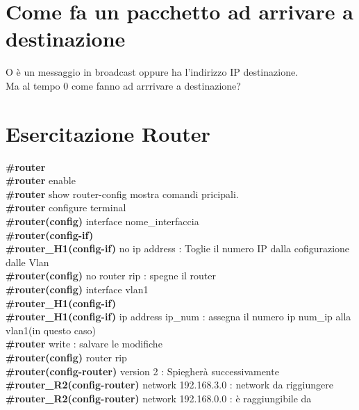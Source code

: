 \documentclass{report}
\begin{document}
    \chapter{Come fa un pacchetto ad arrivare a destinazione} {
        O è un messaggio in broadcast oppure ha l'indirizzo IP destinazione.
        \\ 
        Ma al tempo 0 come fanno ad arrrivare a destinazione?
        \\

				
    }
    \chapter{Esercitazione Router}
        \textbf{\#router}
        \\
        \textbf{\#router} enable 
        \\
        \textbf{\#router} show router-config mostra comandi pricipali.
        \\
        \textbf{\#router} configure terminal 
        \\
        \textbf{\#router(config)} interface nome\_interfaccia 
        \\
        \textbf{\#router(config-if)}
        \\
        \textbf{\#router\_H1(config-if)} no ip address : Toglie il numero IP dalla cofigurazione dalle Vlan
        \\
       \textbf{\#router(config)} no router rip : spegne il router
        \\
        \textbf{\#router(config)} interface vlan1
        \\
        \textbf{\#router\_H1(config-if)}
        \\
        \textbf{\#router\_H1(config-if)} ip address ip\_num : assegna il numero ip num\_ip alla vlan1(in questo caso)
        \\
        \textbf{\#router} write : salvare le modifiche
        \\
        \textbf{\#router(config)} router rip
        \\
        \textbf{\#router(config-router)} version 2 : Spiegherà successivamente
         \\
        \textbf{\#router\_R2(config-router)} network 192.168.3.0 : network da riggiungere
         \\
        \textbf{\#router\_R2(config-router)} network 192.168.0.0 : è raggiungibile da

        
\end{document}
